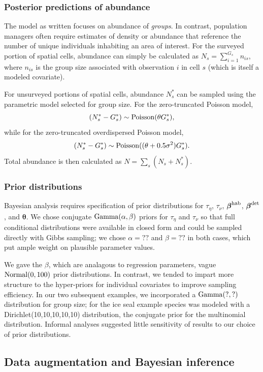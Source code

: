\documentclass[10pt]{article}
\begin{document}
\subsubsection*{Posterior predictions of abundance}

The model as written focuses on abundance of \emph{groups}.  In contrast, population managers often require estimates of density or abundance that reference the number of unique individuals inhabiting an area of interest.  For the surveyed portion of spatial cells, abundance can simply be calculated as $N_s=\sum_{i=1}^{G_s} n_{is}$, where $n_{is}$ is the group size associated with observation $i$ in cell $s$ (which is itself a modeled covariate).

For unsurveyed portions of spatial cells, abundance $N_s^*$ can be sampled using the parametric model selected for group size.  For the zero-truncated Poisson model,
$$(N_s^*-G_s^*) \sim {\rm Poisson}(\theta G_s^*),
$$
while for the zero-truncated overdispersed Poisson model,
$$(N_s^*-G_s^*) \sim {\rm Poisson}((\theta+0.5\sigma^2) G_s^*).$$
Total abundance is then calculated as $N=\sum_s (N_s+N_s^*)$.

\subsubsection*{Prior distributions}

Bayesian analysis requires specification of prior distributions for $\tau_\eta$, $\tau_\nu$, $\boldsymbol{\beta}^{\rm hab}$, $\boldsymbol{\beta}^{\rm det}$, and $\boldsymbol{\theta}$.  We chose conjugate ${\rm Gamma}(\alpha,\beta)$ priors for $\tau_\eta$ and $\tau_\nu$ so that full conditional distributions were available in closed form and could be sampled directly with Gibbs sampling; we chose $\alpha=??$ and $\beta=??$ in both cases, which put ample weight on plausible parameter values.

We gave the $\beta$, which are analagous to regression parameters, vague ${\rm Normal}(0,100)$ prior distributions.  In contrast, we tended to impart more structure to the hyper-priors for individual covariates to improve sampling efficiency.  In our two subsequent examples, we incorporated a ${\rm Gamma}(?,?)$ distribution for group size; for the ice seal example species was modeled with a Dirichlet(10,10,10,10,10) distribution, the conjugate prior for the multinomial distribution.  Informal analyses suggested little sensitivity of results to our choice of prior distributions.

\subsection*{Data augmentation and Bayesian inference}
\end{document}
